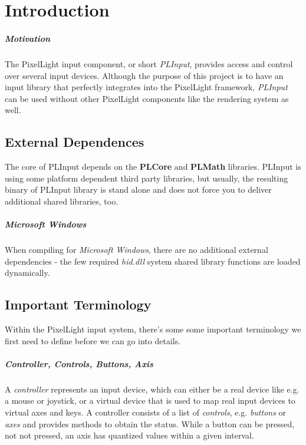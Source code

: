 \chapter{Introduction}


\paragraph{Motivation}
The PixelLight input component, or short \emph{PLInput}, provides access and control over several input devices. Although the purpose of this project is to have an input library that perfectly integrates into the PixelLight framework, \emph{PLInput} can be used without other PixelLight components like the rendering system as well.




\section{External Dependences}
The core of PLInput depends on the \textbf{PLCore} and \textbf{PLMath} libraries. PLInput is using some platform dependent third party libraries, but usually, the resulting binary of PLInput library is stand alone and does not force you to deliver additional shared libraries, too.


\paragraph{Microsoft Windows}
When compiling for \emph{Microsoft Windows}, there are no additional external dependencies - the few required \emph{hid.dll} system shared library functions are loaded dynamically.




\section{Important Terminology}
Within the PixelLight input system, there's some some important terminology we first need to define before we can go into details.

\paragraph{Controller, Controls, Buttons, Axis}
A \emph{controller} represents an input device, which can either be a real device like e.g. a mouse or joystick, or a virtual device that is used to map real input devices to virtual axes and keys. A controller consists of a list of \emph{controls}, e.g. \emph{buttons} or \emph{axes} and provides methods to obtain the status. While a button can be pressed, not not pressed, an axis has quantized values within a given interval.

